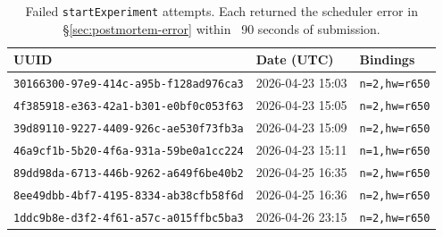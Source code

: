 \documentclass[11pt,a4paper]{article}
\begin{document}
\begin{table}[H]
\centering
\small
\caption{Failed \texttt{startExperiment} attempts. Each returned the scheduler error in §\ref{sec:postmortem-error} within ~90 seconds of submission.}
\label{tab:appendix-failed}
\begin{tabular}{@{}lll@{}}
\toprule
UUID & Date (UTC) & Bindings \\
\midrule
\texttt{30166300-97e9-414c-a95b-f128ad976ca3} & 2026-04-23 15:03 & \texttt{n=2,hw=r650} \\
\texttt{4f385918-e363-42a1-b301-e0bf0c053f63} & 2026-04-23 15:05 & \texttt{n=2,hw=r650} \\
\texttt{39d89110-9227-4409-926c-ae530f73fb3a} & 2026-04-23 15:09 & \texttt{n=2,hw=r650} \\
\texttt{46a9cf1b-5b20-4f6a-931a-59be0a1cc224} & 2026-04-23 15:11 & \texttt{n=1,hw=r650} \\
\texttt{89dd98da-6713-446b-9262-a649f6be40b2} & 2026-04-25 16:35 & \texttt{n=2,hw=r650} \\
\texttt{8ee49dbb-4bf7-4195-8334-ab38cfb58f6d} & 2026-04-25 16:36 & \texttt{n=2,hw=r650} \\
\texttt{1ddc9b8e-d3f2-4f61-a57c-a015ffbc5ba3} & 2026-04-26 23:15 & \texttt{n=2,hw=r650} \\
\bottomrule
\end{tabular}
\end{table}
\end{document}
